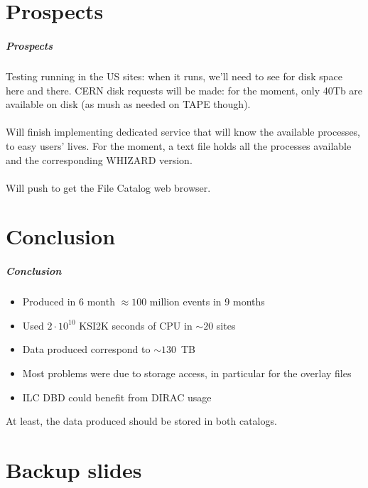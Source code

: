 \documentclass{beamer}
\begin{document}
\part{Prospects}
\begin{frame}
\partpage 
\end{frame}

\begin{frame}
\frametitle{Prospects} 
Testing running in the US sites: when it runs, we'll need to see for disk space here and there. CERN disk requests will be made: for the moment, only 40Tb are available on disk (as mush as needed on TAPE though).\\
~\\
Will finish implementing dedicated service that will know the available processes, to easy users' lives. For the moment, a text file holds all the processes available and the corresponding WHIZARD version.\\
~\\
Will push to get the File Catalog web browser.
\end{frame}

\part{Conclusion}
\begin{frame}
\partpage 
\end{frame}

\begin{frame}
\frametitle{Conclusion} 
\begin{itemize}
\item Produced in 6 month $\approx 100$ million events in 9 months
\item Used $2\cdot 10^{10}$ KSI2K seconds of CPU in $\sim 20$ sites
\item Data produced correspond to $\sim 130$~TB
\item Most problems were due to storage access, in particular for the overlay files
\item ILC DBD could benefit from DIRAC usage
\end{itemize}
At least, the data produced should be stored in both catalogs.
\end{frame}

\appendix
\part{Backup slides}
\begin{frame}
\partpage 
\end{frame}
\end{document}
